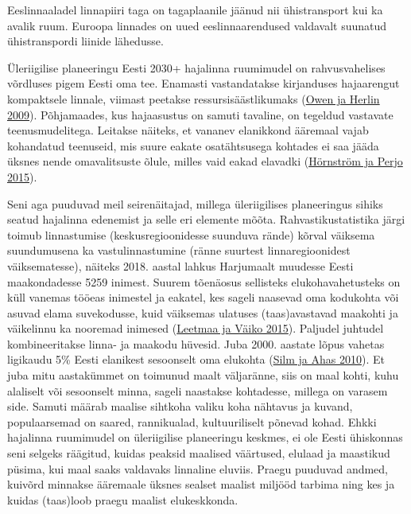 \documentclass[estonian,]{article}
\begin{document}
\begin{blockquote-left}
Eeslinnaaladel linnapiiri taga on tagaplaanile jäänud nii ühistransport
kui ka avalik ruum. Euroopa linnades on uued eeslinnaarendused valdavalt
suunatud ühistranspordi liinide lähedusse.
\end{blockquote-left}

Üleriigilise planeeringu Eesti 2030+ hajalinna ruumimudel on rahvusvahelises võrdluses pigem Eesti oma tee. Enamasti vastandatakse kirjanduses hajaarengut kompaktsele linnale, viimast peetakse ressursisäästlikumaks (\protect\hyperlink{Owen2009}{Owen ja Herlin 2009}). Põhjamaades, kus hajaasustus on samuti tavaline, on tegeldud vastavate teenusmudelitega. Leitakse näiteks, et vananev elanikkond ääremaal vajab kohandatud teenuseid, mis suure eakate osatähtsusega kohtades ei saa jääda üksnes nende omavalitsuste õlule, milles vaid eakad elavadki (\protect\hyperlink{Huxf6rnstruxf6m2015}{Hörnström ja Perjo 2015}).

Seni aga puuduvad meil seirenäitajad, millega üleriigilises planeeringus sihiks seatud hajalinna edenemist ja selle eri elemente mõõta. Rahvastikustatistika järgi toimub linnastumise (keskusregioonidesse suunduva rände) kõrval väiksema suundumusena ka vastulinnastumine (ränne suurtest linnaregioonidest väiksematesse), näiteks 2018. aastal lahkus Harjumaalt muudesse Eesti maakondadesse 5259 inimest. Suurem tõenäosus sellisteks elukohavahetusteks on küll vanemas tööeas inimestel ja eakatel, kes sageli naasevad oma kodukohta või asuvad elama suvekodusse, kuid väiksemas ulatuses (taas)avastavad maakohti ja väikelinnu ka nooremad inimesed (\protect\hyperlink{Leetmaa2015}{Leetmaa ja Väiko 2015}). Paljudel juhtudel kombineeritakse linna- ja maakodu hüvesid. Juba 2000. aastate lõpus vahetas ligikaudu 5\% Eesti elanikest sesoonselt oma elukohta (\protect\hyperlink{Silm2010}{Silm ja Ahas 2010}). Et juba mitu aastakümmet on toimunud maalt väljaränne, siis on maal kohti, kuhu alaliselt või sesoonselt minna, sageli naastakse kohtadesse, millega on varasem side. Samuti määrab maalise sihtkoha valiku koha nähtavus ja kuvand, populaarsemad on saared, rannikualad, kultuuriliselt põnevad kohad. Ehkki hajalinna ruumimudel on üleriigilise planeeringu keskmes, ei ole Eesti ühiskonnas seni selgeks räägitud, kuidas peaksid maalised väärtused, elulaad ja maastikud püsima, kui maal saaks valdavaks linnaline eluviis. Praegu puuduvad andmed, kuivõrd minnakse ääremaale üksnes sealset maalist miljööd tarbima ning kes ja kuidas (taas)loob praegu maalist elukeskkonda.
\end{document}
